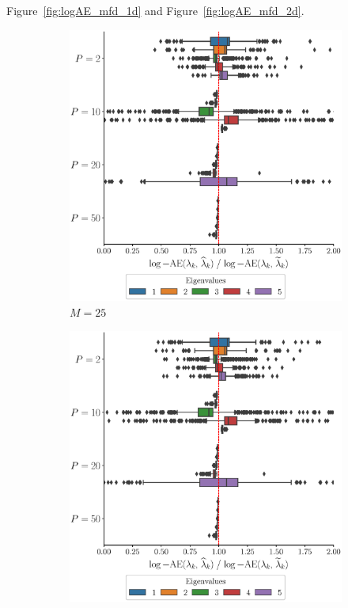 \begin{results}

Figure~\ref{fig:logAE_mfd_1d} and Figure~\ref{fig:logAE_mfd_2d}.

\begin{figure}
     \centering
     \begin{subfigure}[b]{0.49\textwidth}
         \centering
         \includegraphics[width=\textwidth]{figures/scenario_1/logAE_N50_M25.eps}
         \caption{$M = 25$}
         \label{fig:logAE_mfd_1d_25}
     \end{subfigure}
     \hfill
     \begin{subfigure}[b]{0.49\textwidth}
         \centering
         \includegraphics[width=\textwidth]{figures/scenario_1/logAE_N50_M50.eps}

\end{subfigure}
\end{figure}
\end{results}
